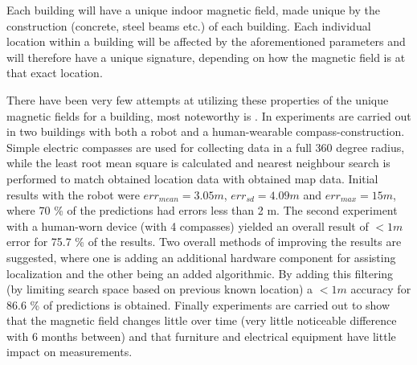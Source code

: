 Each building will have a unique indoor magnetic field, made unique by the construction (concrete, steel beams etc.) of each building.
Each individual location within a building will be affected by the aforementioned parameters and will therefore have a unique signature, depending on how the magnetic field is at that exact location.

There have been very few attempts at utilizing these properties of the unique magnetic fields for a building, most noteworthy is \cite{geomagnetism}.
In \citet{geomagnetism} experiments are carried out in two buildings with both a robot and a human-wearable compass-construction.
Simple electric compasses are used for collecting data in a full 360 degree radius, while the least root mean square is calculated and nearest neighbour search is performed to match obtained location data with obtained map data.
Initial results with the robot were $err_{mean} = 3.05 m$, $err_{sd} = 4.09 m$ and $err_{max} = 15 m$, where 70 \% of the predictions had errors less than 2 m.
The second experiment with a human-worn device (with 4 compasses) yielded an overall result of $<1m$ error for 75.7 \% of the results.
Two overall methods of improving the results are suggested, where one is adding an additional hardware component for assisting localization and the other being an added algorithmic.
By adding this filtering (by limiting search space based on previous known location) a $<1 m$ accuracy for 86.6 \% of predictions is obtained.
Finally experiments are carried out to show that the magnetic field changes little over time (very little noticeable difference with 6 months between) and that furniture and electrical equipment have little impact on measurements.


